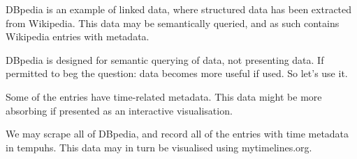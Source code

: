 DBpedia is an example of linked data, where structured data has been extracted
from Wikipedia. This data may be semantically queried, and as such contains
Wikipedia entries with metadata\cite{bizer2009dbpedia}.

DBpedia is designed for semantic querying of data, not presenting data. If
permitted to beg the question: data becomes more useful if used. So let's use
it.

Some of the entries have time-related metadata. This data might be more
absorbing if presented as an interactive visualisation.

We may scrape all of DBpedia, and record all of the entries with time metadata 
in tempuhs. This data may in turn be visualised using mytimelines.org.
